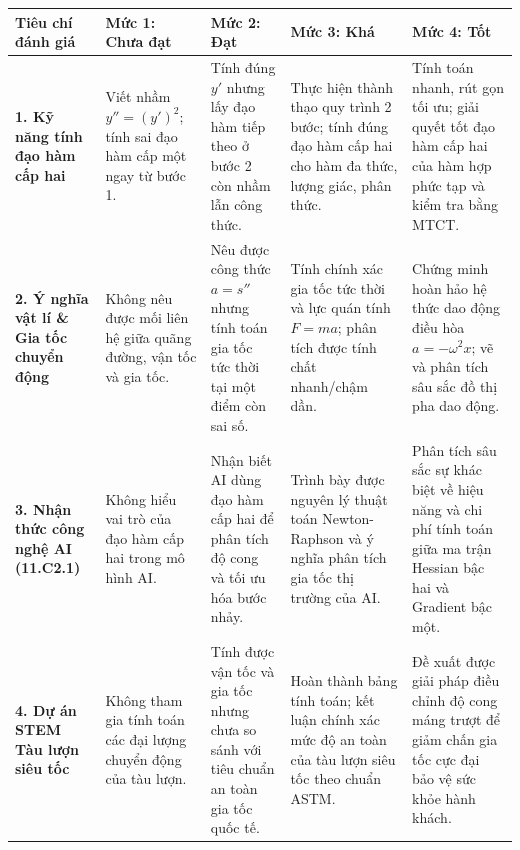 \documentclass[12pt, a4paper]{article}
\begin{document}
\begin{center}
\small
\begin{tabularx}{\linewidth}{|p{3.2cm}|X|X|X|X|}
\hline
\textbf{Tiêu chí đánh giá} & \textbf{Mức 1: Chưa đạt} & \textbf{Mức 2: Đạt} & \textbf{Mức 3: Khá} & \textbf{Mức 4: Tốt} \\ \hline
\textbf{1. Kỹ năng tính đạo hàm cấp hai} & Viết nhầm $y'' = (y')^2$; tính sai đạo hàm cấp một ngay từ bước 1. & Tính đúng $y'$ nhưng lấy đạo hàm tiếp theo ở bước 2 còn nhầm lẫn công thức. & Thực hiện thành thạo quy trình 2 bước; tính đúng đạo hàm cấp hai cho hàm đa thức, lượng giác, phân thức. & Tính toán nhanh, rút gọn tối ưu; giải quyết tốt đạo hàm cấp hai của hàm hợp phức tạp và kiểm tra bằng MTCT. \\ \hline
\textbf{2. Ý nghĩa vật lí \& Gia tốc chuyển động} & Không nêu được mối liên hệ giữa quãng đường, vận tốc và gia tốc. & Nêu được công thức $a = s''$ nhưng tính toán gia tốc tức thời tại một điểm còn sai số. & Tính chính xác gia tốc tức thời và lực quán tính $F = ma$; phân tích được tính chất nhanh/chậm dần. & Chứng minh hoàn hảo hệ thức dao động điều hòa $a = -\omega^2 x$; vẽ và phân tích sâu sắc đồ thị pha dao động. \\ \hline
\textbf{3. Nhận thức công nghệ AI (11.C2.1)} & Không hiểu vai trò của đạo hàm cấp hai trong mô hình AI. & Nhận biết AI dùng đạo hàm cấp hai để phân tích độ cong và tối ưu hóa bước nhảy. & Trình bày được nguyên lý thuật toán Newton-Raphson và ý nghĩa phân tích gia tốc thị trường của AI. & Phân tích sâu sắc sự khác biệt về hiệu năng và chi phí tính toán giữa ma trận Hessian bậc hai và Gradient bậc một. \\ \hline
\textbf{4. Dự án STEM Tàu lượn siêu tốc} & Không tham gia tính toán các đại lượng chuyển động của tàu lượn. & Tính được vận tốc và gia tốc nhưng chưa so sánh với tiêu chuẩn an toàn gia tốc quốc tế. & Hoàn thành bảng tính toán; kết luận chính xác mức độ an toàn của tàu lượn siêu tốc theo chuẩn ASTM. & Đề xuất được giải pháp điều chỉnh độ cong máng trượt để giảm chấn gia tốc cực đại bảo vệ sức khỏe hành khách. \\ \hline
\end{tabularx}
\end{center}
\end{document}
